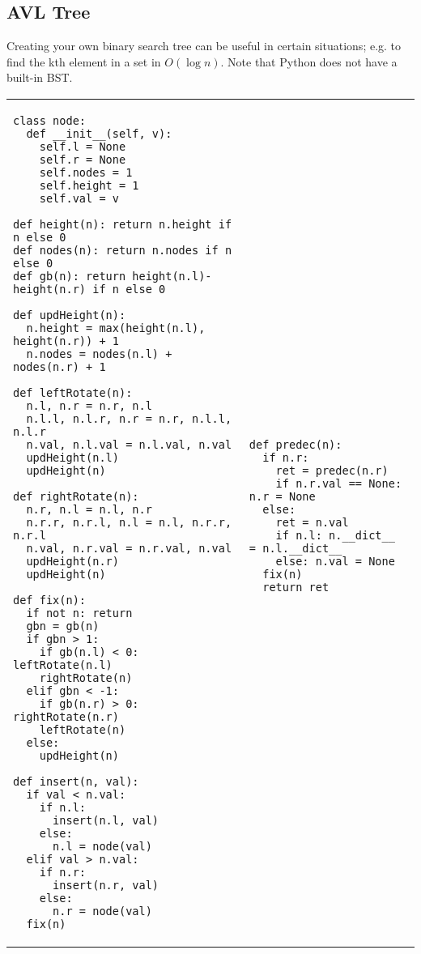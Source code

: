\documentclass[letterpaper]{article}
\begin{document}
\subsection {AVL Tree}

Creating your own binary search tree can be useful in certain situations; e.g.
to find the kth element in a set in $O\left(\log n\right)$. Note that Python
does not have a built-in BST.

\begin{tabular}{@{}p{9cm}p{9cm}@{}}
    \begin{lstlisting}
class node:
  def __init__(self, v):
    self.l = None
    self.r = None
    self.nodes = 1
    self.height = 1
    self.val = v

def height(n): return n.height if n else 0
def nodes(n): return n.nodes if n else 0
def gb(n): return height(n.l)-height(n.r) if n else 0

def updHeight(n):
  n.height = max(height(n.l), height(n.r)) + 1
  n.nodes = nodes(n.l) + nodes(n.r) + 1

def leftRotate(n):
  n.l, n.r = n.r, n.l
  n.l.l, n.l.r, n.r = n.r, n.l.l, n.l.r
  n.val, n.l.val = n.l.val, n.val
  updHeight(n.l)
  updHeight(n)

def rightRotate(n):
  n.r, n.l = n.l, n.r
  n.r.r, n.r.l, n.l = n.l, n.r.r, n.r.l
  n.val, n.r.val = n.r.val, n.val
  updHeight(n.r)
  updHeight(n)

def fix(n):
  if not n: return
  gbn = gb(n)
  if gbn > 1:
    if gb(n.l) < 0: leftRotate(n.l)
    rightRotate(n)
  elif gbn < -1:
    if gb(n.r) > 0: rightRotate(n.r)
    leftRotate(n)
  else:
    updHeight(n)

def insert(n, val):
  if val < n.val:
    if n.l:
      insert(n.l, val)
    else:
      n.l = node(val)
  elif val > n.val:
    if n.r:
      insert(n.r, val)
    else:
      n.r = node(val)
  fix(n)

\end{lstlisting}
     &
    \begin{lstlisting}
def predec(n):
  if n.r:
    ret = predec(n.r)
    if n.r.val == None: n.r = None
  else:
    ret = n.val
    if n.l: n.__dict__ = n.l.__dict__
    else: n.val = None
  fix(n)
  return ret


\end{lstlisting}
\end{tabular}
\end{document}
